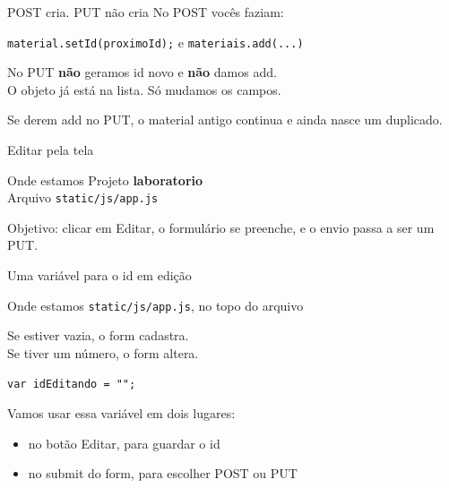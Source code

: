 \documentclass[aspectratio=169,11pt]{beamer}
\newcommand{\onde}[1]{%
  \begin{block}{Onde estamos}
    #1
  \end{block}
}
\begin{document}
\begin{frame}{POST cria. PUT não cria}
  No POST vocês faziam:

  \vspace{0.3em}
  \texttt{material.setId(proximoId);} e \texttt{materiais.add(...)}

  \vspace{0.5em}
  No PUT \textbf{não} geramos id novo e \textbf{não} damos add.\\
  O objeto já está na lista. Só mudamos os campos.

  \vspace{0.5em}
  Se derem add no PUT, o material antigo continua
  e ainda nasce um duplicado.
\end{frame}

\begin{frame}{Editar pela tela}
  \onde{Projeto \textbf{laboratorio}\\
        Arquivo \texttt{static/js/app.js}}

  Objetivo: clicar em Editar, o formulário se preenche,
  e o envio passa a ser um PUT.
\end{frame}

\begin{frame}[fragile]{Uma variável para o id em edição}
  \onde{\texttt{static/js/app.js}, no topo do arquivo}

  Se estiver vazia, o form cadastra.\\
  Se tiver um número, o form altera.

\begin{lstlisting}[basicstyle=\ttfamily\footnotesize]
var idEditando = "";
\end{lstlisting}

  \vspace{0.4em}
  Vamos usar essa variável em dois lugares:
  \begin{itemize}
    \item no botão Editar, para guardar o id
    \item no submit do form, para escolher POST ou PUT
  \end{itemize}
\end{frame}
\end{document}
